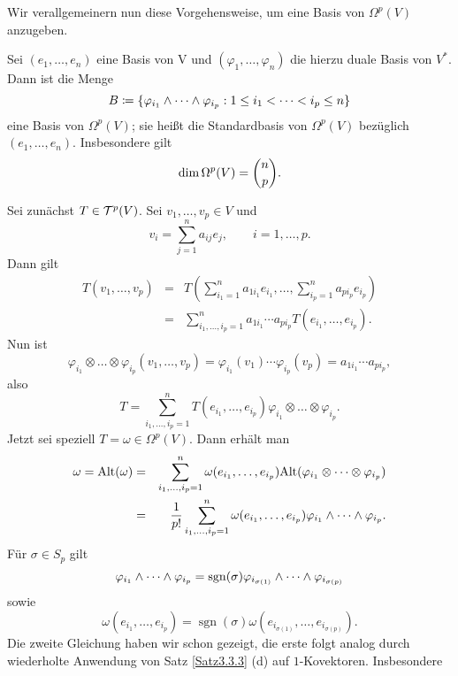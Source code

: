 \documentclass[a4paper,twoside,DIV15,BCOR12mm]{scrbook}
\DeclareMathOperator{\sgn}{sgn}
\begin{document}
\noindent
Wir verallgemeinern nun diese Vorgehensweise, um eine Basis von 
$\Omega^{p}(V)$ anzugeben.

\bigskip

\begin{satz}\label{Satz3.3.6} {Sei $(e_{1},\dots,e_{n})$ eine Basis 
von V und $(\varphi_{1},\dots,\varphi_{n})$ die hierzu duale Basis von $V^*$. Dann ist 
die Menge
\[ B \da  \{ \varphi_{i_1} \wedge \dots \wedge \varphi_{i_p} : 1 \le 
i_{1} < \dots < i_{p} \le n\} \]
eine Basis von $\Omega^{p}(V)$; sie heißt die Standardbasis von $\Omega^p(V)$  bezüglich 
$(e_{1},\dots,e_{n})$. Insbesondere gilt}
\[ {\rm dim}\, \Omega^{p}(V) = {n \choose p}. \]
\end{satz}

\bigskip

 Sei zunächst $T \in {\cal T}^{p}(V)$. Sei 
$v_{1},\dots,v_{p} \in V$ und
\[ v_{i} = \sum_{j=1}^{n} a_{ij} e_{j}, \qquad i = 1,\dots,p. \]
Dann gilt
\begin{eqnarray*}
T(v_{1},\dots,v_{p}) & = & T\left(\sum_{i_{1}=1}^{n} a_{1i_{1}} 
e_{i_1},\dots,\sum_{i_{p}=1}^{n} a_{pi_{p}} e_{i_p} \right) \\
& = & \sum_{i_{1},\dots,i_{p} = 1}^{n} a_{1i_{1}} \cdots a_{pi_{p}} 
T(e_{i_1},\dots,e_{i_p}).
\end{eqnarray*}
Nun ist
\[
\varphi_{i_1} \otimes \dots \otimes \varphi_{i_p} 
(v_{1},\dots,v_{p})  =  \varphi_{i_1}(v_{1}) \cdots 
\varphi_{i_p}(v_{p}) 
 =  a_{1i_{1}} \cdots a_{pi_{p}},
\]
also
\[ T = \sum_{i_{1},\dots,i_{p} = 1}^{n} T(e_{i_1},\dots,e_{i_p}) 
\varphi_{i_1} \otimes \dots \otimes \varphi_{i_p}. \]
Jetzt sei speziell $T = \omega \in \Omega^{p}(V)$. Dann erhält man
\begin{eqnarray*}
\omega = {\rm Alt}(\omega) & = & \sum_{i_{1},\dots,i_{p} = 1}^{n} 
\omega(e_{i_1},\dots,e_{i_p}) {\rm Alt}(\varphi_{i_1} \otimes \dots 
\otimes \varphi_{i_p}) \\
& = & \frac{1}{p!} \sum_{i_{1},\dots,i_{p} = 1}^{n} 
\omega(e_{i_1},\dots,e_{i_p}) \varphi_{i_1} \wedge \dots \wedge 
\varphi_{i_p}.
\end{eqnarray*}
Für $\sigma\in S_p$ gilt
\[ \varphi_{i_1} \wedge \dots \wedge \varphi_{i_p} = {\rm 
sgn}(\sigma) \varphi_{i_{\sigma(1)}} \wedge \dots \wedge 
\varphi_{i_{\sigma(p)}} \]
sowie
\[ \omega(e_{i_1},\dots,e_{i_p}) = \sgn (\sigma) 
\omega(e_{i_{\sigma(1)}},\dots,e_{i_{\sigma(p)}}). \]
Die zweite Gleichung haben wir schon gezeigt, die erste folgt analog durch 
wiederholte Anwendung von Satz \ref{Satz3.3.3} (d) auf $1$-Kovektoren. Insbesondere 
\end{document}
